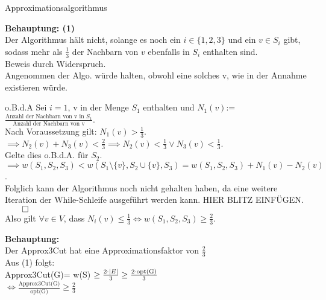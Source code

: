 \documentclass[answers]{submit}
\begin{document}
\begin{exercise}[6]{Approximationsalgorithmus}
{    \textbf{Behauptung: (1)} \\
    Der Algorithmus hält nicht, solange es noch ein $i\in \{ 1,2,3\}$ und ein $v\in S_i$ gibt,
    sodass mehr als $\frac{1}{3}$ der Nachbarn von $v$ ebenfalls in $S_i$ enthalten sind. \\

    Beweis durch Widerspruch. \\

    Angenommen der Algo. würde halten, obwohl eine solches v, wie in der Annahme existieren würde.

    o.B.d.A Sei $i=1$, v in der Menge $S_1$ enthalten und $N_1(v)$:= $\frac{\text{Anzahl der Nachbarn von v in } S_1}{\text{Anzahl der Nachbarn von v}} $. \\

    Nach Voraussetzung gilt: $N_1(v) > \frac{1}{3}$. \\

    $ \implies N_2(v)+N_3(v) < \frac{2}{3} \implies N_2(v) < \frac{1}{3} \lor N_3(v) < \frac{1}{3}$. \\

    Gelte dies o.B.d.A. für $S_2$. \\

    $\implies w(S_1,S_2,S_3)<w(S_{1}\setminus \{ v\}, S_{2}\cup \{ v \} , S_{3}) = w(S_1,S_2,S_3) + N_1(v)-N_2(v)$. \\

    Folglich kann der Algorithmus noch nicht gehalten haben, da eine weitere Iteration der While-Schleife ausgeführt werden kann. HIER BLITZ EINFÜGEN. $\qed$ \\

    Also gilt $\forall v \in V$, dass $N_i(v) \leq \frac{1}{3} \iff w(S_1,S_2,S_3) \geq \frac{2}{3}$.

    \textbf{Behauptung:}\\
    Der Approx3Cut hat eine Approximationsfaktor von $\frac{2}{3}$ \\

    Aus (1) folgt: \\

    Approx3Cut(G)= w(S) $\geq \frac{2\cdot \left\vert E \right\vert}{3} \geq \frac{2 \cdot \text{opt(G)}}{3}$ \\

    $\iff \frac{\text{Approx3Cut(G)}}{\text{opt(G)}} \geq \frac{2}{3}$




  }
\end{exercise}
\end{document}
